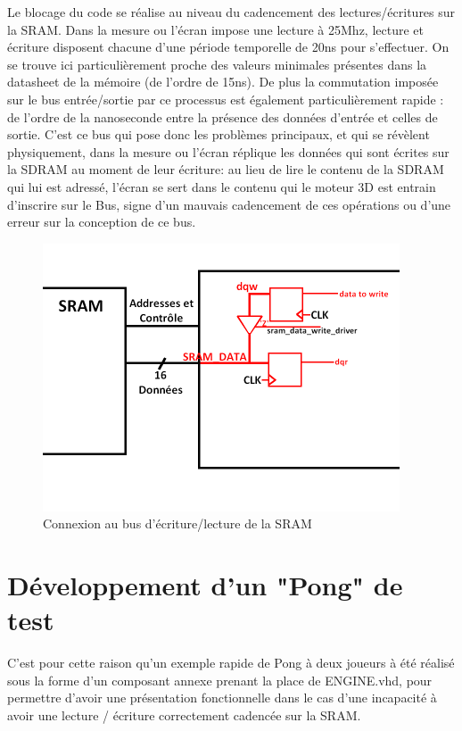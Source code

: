 \documentclass[10pt,a4paper]{report}
\begin{document}
Le blocage du code se réalise au niveau du cadencement des lectures/écritures sur la SRAM. Dans la mesure ou l'écran impose une lecture à 25Mhz, lecture et écriture disposent chacune d'une période temporelle de 20ns pour s'effectuer. On se trouve ici particulièrement proche des valeurs minimales présentes dans la datasheet de la mémoire (de l'ordre de 15ns). De plus la commutation imposée sur le bus entrée/sortie par ce processus est également particulièrement rapide : de l'ordre de la nanoseconde entre la présence des données d'entrée et celles de sortie. C'est ce bus qui pose donc les problèmes principaux, et qui se révèlent physiquement, dans la mesure ou l'écran réplique les données qui sont écrites sur la SDRAM au moment de leur écriture: au lieu de lire le contenu de la SDRAM qui lui est adressé, l'écran se sert dans le contenu qui le moteur 3D est entrain d'inscrire sur le Bus, signe d'un mauvais cadencement de ces opérations ou d'une erreur sur la conception de ce bus.

\begin{figure}[!h]
\centering
\includegraphics[width=300pt]{gfx/sram.png}
\caption{Connexion au bus d'écriture/lecture de la SRAM}
\end{figure}

\newpage

\section{Développement d'un "Pong" de test}

C'est pour cette raison qu'un exemple rapide de Pong à deux joueurs à été réalisé sous la forme d'un composant annexe prenant la place de ENGINE.vhd, pour permettre d'avoir une présentation fonctionnelle dans le cas d'une incapacité à avoir une lecture / écriture correctement cadencée sur la SRAM.
\end{document}
